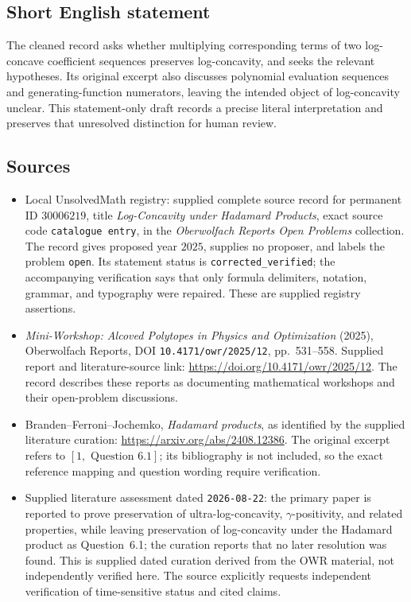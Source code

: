 \documentclass[11pt]{article}
\begin{document}
\subsection{Short English statement}
The cleaned record asks whether multiplying corresponding terms of two log-concave coefficient sequences preserves log-concavity, and seeks the relevant hypotheses. Its original excerpt also discusses polynomial evaluation sequences and generating-function numerators, leaving the intended object of log-concavity unclear. This statement-only draft records a precise literal interpretation and preserves that unresolved distinction for human review.
\subsection{Sources}
\begin{itemize}
\item Local UnsolvedMath registry: supplied complete source record for permanent ID \(30006219\), title \emph{Log-Concavity under Hadamard Products}, exact source code \texttt{catalogue entry}, in the \emph{Oberwolfach Reports Open Problems} collection. The record gives proposed year \(2025\), supplies no proposer, and labels the problem \texttt{open}. Its statement status is \texttt{corrected\_verified}; the accompanying verification says that only formula delimiters, notation, grammar, and typography were repaired. These are supplied registry assertions.
\item \emph{Mini-Workshop: Alcoved Polytopes in Physics and Optimization} (2025), Oberwolfach Reports, DOI \texttt{10.4171/owr/2025/12}, pp.\ 531--558. Supplied report and literature-source link: \url{https://doi.org/10.4171/owr/2025/12}. The record describes these reports as documenting mathematical workshops and their open-problem discussions.
\item Branden--Ferroni--Jochemko, \emph{Hadamard products}, as identified by the supplied literature curation: \url{https://arxiv.org/abs/2408.12386}. The original excerpt refers to \([1,\text{ Question }6.1]\); its bibliography is not included, so the exact reference mapping and question wording require verification.
\item Supplied literature assessment dated \texttt{2026-08-22}: the primary paper is reported to prove preservation of ultra-log-concavity, \(\gamma\)-positivity, and related properties, while leaving preservation of log-concavity under the Hadamard product as Question~6.1; the curation reports that no later resolution was found. This is supplied dated curation derived from the OWR material, not independently verified here. The source explicitly requests independent verification of time-sensitive status and cited claims.
\end{itemize}
\end{document}
